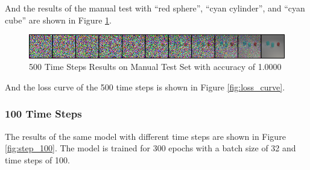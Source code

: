 And the results of the manual test with ``red sphere'', ``cyan cylinder'', and ``cyan cube'' are shown in Figure \ref{fig:step_500_manual}.

\begin{figure}[H]
    \centering
    \includegraphics[width=\textwidth]{figures/step_500_manual_test.png}
    \caption{500 Time Steps Results on Manual Test Set with accuracy of 1.0000}
    \label{fig:step_500_manual}
\end{figure}
And the loss curve of the 500 time steps is shown in Figure \ref{fig:loss_curve}.

\subsubsection{100 Time Steps}

The results of the same model with different time steps are shown in Figure \ref{fig:step_100}.
The model is trained for 300 epochs with a batch size of 32 and time steps of 100.

